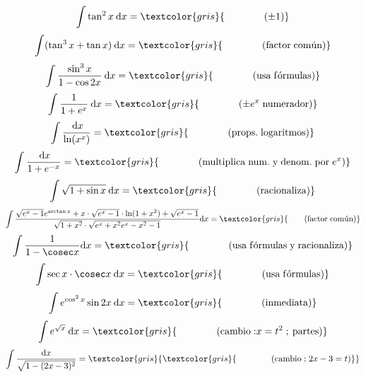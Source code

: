 {\begin{fleqn}
	\begin{equation}
		\int \tan^2 x\:\mathrm{d}x= \textcolor{gris}{\qquad \qquad  \mathrm{(\pm1)}}
	\end{equation}
	\begin{equation}
		\int (\tan^3x+\tan x)\:\mathrm{d}x= \textcolor{gris}{\qquad \qquad \mathrm{(factor\; com \acute{u}n)}}
	\end{equation}
	\begin{equation}
		\int \frac{\sin^3 x}{1-\cos 2x}\:\mathrm{d}x= \textcolor{gris}{\qquad \qquad \mathrm{(usa\; f\acute {o} rmulas)}}
	\end{equation}
	\begin{equation}
		\int \frac{1}{1+e^x}\:\mathrm{d}x= \textcolor{gris}{\qquad \qquad \mathrm{(\pm}{e^x}\; \mathrm{numerador)}}
	\end{equation}
	\begin{equation}
		\int \frac{\:\mathrm{d}x}{\mathrm{ln} (x^x)}= \textcolor{gris}{\qquad \qquad \mathrm{(props.\;logaritmos)}}
	\end{equation}
	\begin{equation}
		\int \frac{\:\mathrm{d}x}{1+e^{-x}}= \textcolor{gris}{\qquad \qquad \mathrm{(multiplica \; num.\;y\;denom.\;por} \;e^x \mathrm{)}}
	\end{equation}
	\begin{equation}
		\int \sqrt{1+\sin x}\:\mathrm{d}x= \textcolor{gris}{\qquad \qquad \mathrm{(racionaliza)}}
	\end{equation}
	\begin{equation}
		\int \frac{\sqrt{e^x-1}e^{\arctan x}+x\cdot \sqrt{e^x-1}\cdot \mathrm{ln} (1+x^2)+\sqrt{e^x-1}}{\sqrt{1+x^2}\cdot \sqrt{e^x +x^2 e^x -x^2 -1}} \mathrm{d}x= \textcolor{gris}{\qquad  \mathrm{(factor\; com \acute{u}n)}}
	\end{equation}
	\begin{equation}
		\int \frac{1}{1-\cosec x}\mathrm{d}x= \textcolor{gris}{\qquad \qquad \mathrm{(usa\; f\acute {o} rmulas \;y \; racionaliza)}}
	\end{equation}
	\begin{equation}
		\int \sec x\cdot \cosec x\:\mathrm{d}x= \textcolor{gris}{\qquad \qquad \mathrm{(usa\; f\acute {o} rmulas)}}
	\end{equation}
	\begin{equation}
		\int e^{\cos^2x}\sin 2x\: \mathrm{d}x= \textcolor{gris}{	\qquad \qquad \text{(inmediata)}}
		\end{equation}
	\begin{equation}
		\int e^{\sqrt x}\:\mathrm{d}x= \textcolor{gris}{\qquad\qquad \mathrm{(cambio:}x=t^2\; ;\: \mathrm{partes})}
	\end{equation}
	\begin{equation}
		\int \frac{\mathrm{d}x}{\sqrt{1-(2x-3)^2}}= \textcolor{gris}{\textcolor{gris}{\qquad\qquad \mathrm{(cambio:\; }2x-3=t \mathrm{)}}}
	\end{equation}
	

\end{fleqn}}
